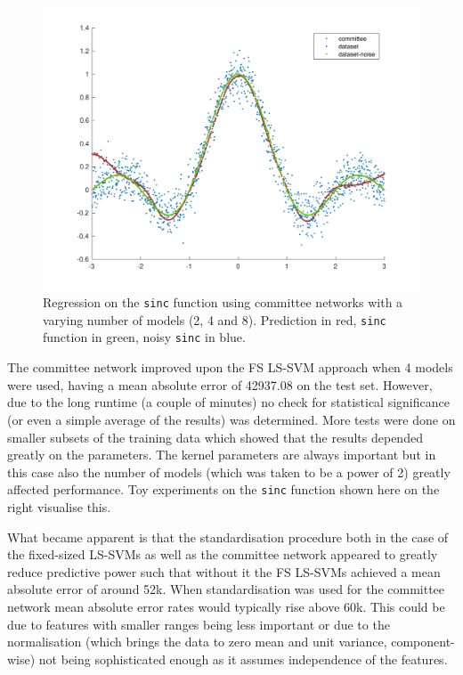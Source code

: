\begin{figure}
\begin{minipage}{\linewidth}
\includegraphics[width=\linewidth]{../src/figures/committee/sinc_8_models}
\end{minipage}
\caption{Regression on the \texttt{sinc} function using committee networks with a varying number of models (2, 4 and 8). Prediction in red, \texttt{sinc} function in green, noisy \texttt{sinc} in blue.}
\label{committeesinc}
\end{figure}

\par The committee network improved upon the FS LS-SVM approach when 4 models were used, having a mean absolute error of 42937.08 on the test set. However, due to the long runtime (a couple of minutes) no check for statistical significance (or even a simple average of the results) was determined. More tests were done on smaller subsets of the training data which showed that the results depended greatly on the parameters. The kernel parameters are always important but in this case also the number of models (which was taken to be a power of 2) greatly affected performance. Toy experiments on the \texttt{sinc} function shown here on the right visualise this.

\par What became apparent is that the standardisation procedure both in the case of the fixed-sized LS-SVMs as well as the committee network appeared to greatly reduce predictive power such that without it the FS LS-SVMs achieved a mean absolute error of around 52k. When standardisation was used for the committee network mean absolute error rates would typically rise above 60k. This could be due to features with smaller ranges being less important or due to the normalisation (which brings the data to zero mean and unit variance, component-wise) not being sophisticated enough as it assumes independence of the features.


